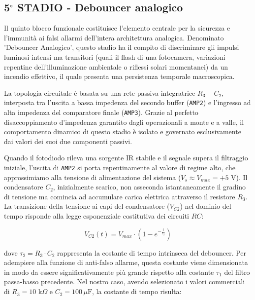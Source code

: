 \documentclass[12pt,a4paper]{article}
\begin{document}
    \subsection{5$^\circ$ STADIO - Debouncer analogico}
        Il quinto blocco funzionale costituisce l'elemento centrale per la sicurezza e l'immunità ai falsi allarmi dell'intera architettura analogica. 
        Denominato 'Debouncer Analogico', questo stadio ha il compito di discriminare gli impulsi luminosi intensi ma transitori (quali il flash di una 
        fotocamera, variazioni repentine dell'illuminazione ambientale o riflessi solari momentanei) da un incendio effettivo, il quale presenta una 
        persistenza temporale macroscopica.

        La topologia circuitale è basata su una rete passiva integratrice $R_3 - C_2$, interposta tra l'uscita a bassa impedenza del secondo buffer 
        (\texttt{AMP2}) e l'ingresso ad alta impedenza del comparatore finale (\texttt{AMP3}). Grazie al perfetto disaccoppiamento d'impedenza garantito 
        dagli operazionali a monte e a valle, il comportamento dinamico di questo stadio è isolato e governato esclusivamente dai valori dei suoi due componenti passivi.

        Quando il fotodiodo rileva una sorgente IR stabile e il segnale supera il filtraggio iniziale, l'uscita di \texttt{AMP2} si porta repentinamente 
        al valore di regime alto, che approssimiamo alla tensione di alimentazione del sistema ($V_s \approx V_{max} = +5\text{ V}$). Il condensatore $C_2$, 
        inizialmente scarico, non asseconda istantaneamente il gradino di tensione ma comincia ad accumulare carica elettrica attraverso il resistore $R_3$. 
        La transizione della tensione ai capi del condensatore ($V_{C2}$) nel dominio del tempo risponde alla legge esponenziale costitutiva dei circuiti $RC$:

        \begin{equation}
            V_{C2}(t) = V_{max} \cdot \left(1 - e^{-\frac{t}{\tau_2}}\right)
        \end{equation}

        dove $\tau_2 = R_3 \cdot C_2$ rappresenta la costante di tempo intrinseca del debouncer. Per adempiere alla funzione di anti-falso allarme, questa costante 
        viene dimensionata in modo da essere significativamente più grande rispetto alla costante $\tau_1$ del filtro passa-basso precedente. Nel nostro caso, 
        avendo selezionato i valori commerciali di $R_3 = 10\text{ k}\Omega$ e $C_2 = 100\,\mu\text{F}$, la costante di tempo risulta:
\end{document}
